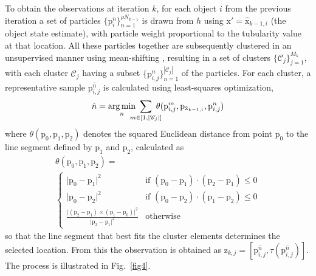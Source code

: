 To obtain the observations at iteration $k$, for each object $i$ from the previous iteration a set of particles $\{\mathrm{p}_{i}^{n}\}_{n=1}^{\rho N_{k-1}}$ is drawn from $h$ using $\mathrm{x'}=\hat{\mathrm{x}}_{k-1,i}$ (the object state estimate), with particle weight proportional to the tubularity value at that location. All these particles together are subsequently clustered in an unsupervised manner using mean-shifting \cite{cheng1995mean}, resulting in a set of clusters $\lbrace \mathscr{C}_j \rbrace_{j=1}^{M_k}$, with each cluster $\mathscr{C}_j$ having a subset $\lbrace\mathrm{p}_{i,j}^n\rbrace_{n=1}^{|\mathscr{C}_j|}$ of the particles. For each cluster, a representative sample $\mathrm{p}_{i,j}^{\hat{n}}$ is calculated using least-squares optimization,
\begin{equation}
\label{eq:n-measure} %
\hat{n} = \argmin_n \!\!\!\!\!\sum\limits_{m \in \left[ 1, |\mathscr{C}_j| \right]}\!\!\!\!\! \theta(\mathrm{p}_{i,j}^m, \mathrm{p}_{\hat{\mathrm{x}}_{k-1,i}}, \mathrm{p}_{i,j}^n)
\end{equation}
where $\theta(\mathrm{p}_0, \mathrm{p}_1, \mathrm{p}_2)$ denotes the squared Euclidean distance from point $\mathrm{p}_0$ to the line segment defined by $\mathrm{p}_1$ and $\mathrm{p}_2$, calculated as
\begin{multline}
\label{eq:theta}
\theta(\mathrm{p}_0, \mathrm{p}_1, \mathrm{p}_2) = \\
\begin{cases}
\vert \mathrm{p}_0 - \mathrm{p}_1 \vert^2 & \textrm{if\ } (\mathrm{p}_0-\mathrm{p}_1) \cdot (\mathrm{p}_2-\mathrm{p}_1) \leq 0 \\
\vert \mathrm{p}_0 - \mathrm{p}_2 \vert^2 & \textrm{if\ } (\mathrm{p}_0-\mathrm{p}_2) \cdot (\mathrm{p}_1-\mathrm{p}_2) \leq 0 \\
\frac{\vert(\mathrm{p}_2-\mathrm{p}_1) \times (\mathrm{p}_1-\mathrm{p}_0)\vert^2}{\vert\mathrm{p}_2-\mathrm{p}_1\vert^2} & \textrm{otherwise}
\end{cases}
\end{multline}
so that the line segment that best fits the cluster elements determines the selected location. From this the observation is obtained as $\mathrm{z}_{k,j} = [\mathrm{p}_{i,j}^{\hat{n}}, \tau(\mathrm{p}_{i,j}^{\hat{n}})]$. The process is illustrated in Fig.~\ref{fig4}.
